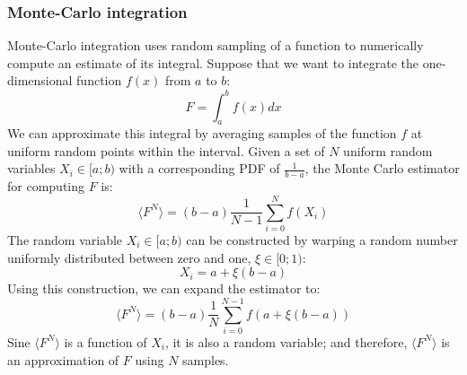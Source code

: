 \subsubsection{Monte-Carlo integration}
Monte-Carlo integration uses random sampling of a function to numerically compute an estimate of its integral. Suppose that we want to integrate the one-dimensional function $f(x)$ from $a$ to $b$:
\begin{equation}
	F = \int_a^b f(x) dx
\end{equation}
We can approximate this integral by averaging samples of the function $f$ at uniform random points within the interval. Given a set of $N$ uniform random variables $X_i \in [a;b)$ with a corresponding PDF of $\frac{1}{b-a}$, the Monte Carlo estimator for computing $F$ is:
\begin{equation}
	\langle F^N \rangle = (b-a) \frac{1}{N-1} \sum_{i=0}^N f(X_i)
\end{equation}
The random variable $X_i \in [a;b)$ can be constructed by warping a random number uniformly distributed between zero and one, $\xi \in [0;1)$:
\begin{equation}
	X_i = a + \xi (b-a)
\end{equation}
Using this construction, we can expand the estimator to:
\begin{equation}
	\langle F^N \rangle = (b-a) \frac{1}{N} \sum_{i=0}^{N-1} f(a + \xi (b-a))
\end{equation}
Sine $\langle F^N \rangle$ is a function of $X_i$, it is also a random variable; and therefore, $\langle F^N \rangle$ is an approximation of $F$ using $N$ samples.

